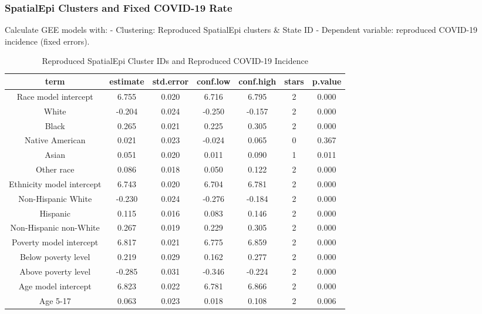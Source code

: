 \documentclass[
]{article}
\begin{document}
\hypertarget{spatialepi-clusters-and-fixed-covid-19-rate}{%
\subsubsection{SpatialEpi Clusters and Fixed COVID-19
Rate}\label{spatialepi-clusters-and-fixed-covid-19-rate}}

Calculate GEE models with: - Clustering: Reproduced SpatialEpi clusters
\& State ID - Dependent variable: reproduced COVID-19 incidence (fixed
errors).

\begin{table}

\caption{\label{tab:gee-spatialepi-clusters-reproduced-incidence}Reproduced SpatialEpi Cluster IDs and Reproduced COVID-19 Incidence}
\centering
\begin{tabular}[t]{c|c|c|c|c|c|c}
\hline
term & estimate & std.error & conf.low & conf.high & stars & p.value\\
\hline
Race model intercept & 6.755 & 0.020 & 6.716 & 6.795 & 2 & 0.000\\
\hline
White & -0.204 & 0.024 & -0.250 & -0.157 & 2 & 0.000\\
\hline
Black & 0.265 & 0.021 & 0.225 & 0.305 & 2 & 0.000\\
\hline
Native American & 0.021 & 0.023 & -0.024 & 0.065 & 0 & 0.367\\
\hline
Asian & 0.051 & 0.020 & 0.011 & 0.090 & 1 & 0.011\\
\hline
Other race & 0.086 & 0.018 & 0.050 & 0.122 & 2 & 0.000\\
\hline
Ethnicity model intercept & 6.743 & 0.020 & 6.704 & 6.781 & 2 & 0.000\\
\hline
Non-Hispanic White & -0.230 & 0.024 & -0.276 & -0.184 & 2 & 0.000\\
\hline
Hispanic & 0.115 & 0.016 & 0.083 & 0.146 & 2 & 0.000\\
\hline
Non-Hispanic non-White & 0.267 & 0.019 & 0.229 & 0.305 & 2 & 0.000\\
\hline
Poverty model intercept & 6.817 & 0.021 & 6.775 & 6.859 & 2 & 0.000\\
\hline
Below poverty level & 0.219 & 0.029 & 0.162 & 0.277 & 2 & 0.000\\
\hline
Above poverty level & -0.285 & 0.031 & -0.346 & -0.224 & 2 & 0.000\\
\hline
Age model intercept & 6.823 & 0.022 & 6.781 & 6.866 & 2 & 0.000\\
\hline
Age 5-17 & 0.063 & 0.023 & 0.018 & 0.108 & 2 & 0.006\\

\end{tabular}
\end{table}
\end{document}
